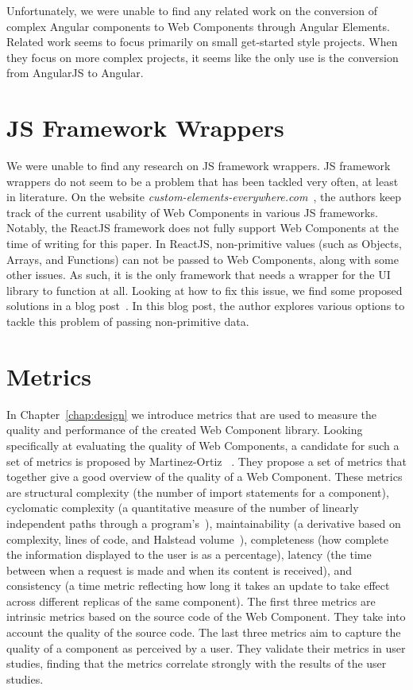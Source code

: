 Unfortunately, we were unable to find any related work on the conversion of complex Angular components to Web Components through Angular Elements. Related work seems to focus primarily on small get-started style projects. When they focus on more complex projects, it seems like the only use is the conversion from AngularJS to Angular.

\section{JS Framework Wrappers}
We were unable to find any research on JS framework wrappers. JS framework wrappers do not seem to be a problem that has been tackled very often, at least in literature. On the website \emph{custom-elements-everywhere.com}~, the authors keep track of the current usability of Web Components in various JS frameworks. Notably, the ReactJS framework does not fully support Web Components at the time of writing for this paper. In ReactJS, non-primitive values (such as Objects, Arrays, and Functions) can not be passed to Web Components, along with some other issues. As such, it is the only framework that needs a wrapper for the UI library to function at all. Looking at how to fix this issue, we find some proposed solutions in a blog post~. In this blog post, the author explores various options to tackle this problem of passing non-primitive data.

\section{Metrics}\label{sec:related-work:metrics}
In Chapter~\ref{chap:design} we introduce metrics that are used to measure the quality and performance of the created Web Component library. Looking specifically at evaluating the quality of Web Components, a candidate for such a set of metrics is proposed by Martinez-Ortiz \etal{}~\cite{martinez-ortiz2016quality}. They propose a set of metrics that together give a good overview of the quality of a Web Component. These metrics are structural complexity (the number of import statements for a component), cyclomatic complexity (a quantitative measure of the number of linearly independent paths through a program's~\cite{1702388}), maintainability (a derivative based on complexity, lines of code, and Halstead volume~\cite{halstead1977elements}), completeness (how complete the information displayed to the user is as a percentage), latency (the time between when a request is made and when its content is received), and consistency (a time metric reflecting how long it takes an update to take effect across different replicas of the same component). The first three metrics are intrinsic metrics based on the source code of the Web Component. They take into account the quality of the source code. The last three metrics aim to capture the quality of a component as perceived by a user. They validate their metrics in user studies, finding that the metrics correlate strongly with the results of the user studies.


